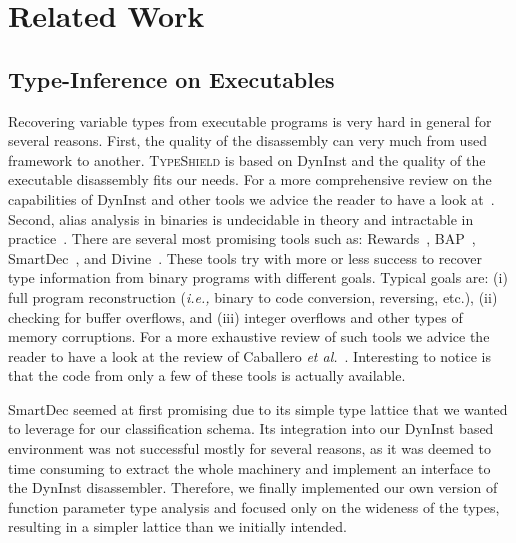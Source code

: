 \section{Related Work}
\label{chapter:Related_Work}

\subsection{Type-Inference on Executables}
\label{Type-Inference on Executables}
Recovering variable types from executable programs
is very hard in general for several reasons. 
First, the quality of the disassembly can very much from used
framework to another. \textsc{TypeShield} is based on DynInst 
and the quality of the executable disassembly fits our needs. 
For a more comprehensive review on the capabilities of DynInst and other tools we
advice the reader to have a look at~\cite{andriesse:indepth}.
Second, alias analysis in binaries is undecidable in theory and intractable in practice~\cite{alan:mycroft}.
There are several most promising tools such as: Rewards~\cite{lin:rewards}, BAP~\cite{bap:brumley}, 
SmartDec~\cite{fokin:smartdec}, and Divine~\cite{divine:balakrishnan}.
These tools try with more or less success to recover 
type information from binary programs with different goals.
Typical goals are: 
(i) full program reconstruction (\textit{i.e.,} binary to code conversion, reversing, etc.), 
(ii) checking for buffer overflows, and
(iii) integer overflows and other types of memory corruptions.
For a more exhaustive review of such tools we advice the reader to
have a look at the review of Caballero \textit{et al.}~\cite{caballero:inference}.
Interesting to notice is that the code from only a few of these tools is actually available.

SmartDec seemed at first promising due to its simple type lattice that we wanted to leverage for our classification schema. 
Its integration into our DynInst based environment was not successful mostly for several reasons, as it was deemed to 
time consuming to extract the whole machinery and implement an interface to the DynInst disassembler.
Therefore, we finally implemented our own version of function parameter type analysis and focused only
on the wideness of the types, resulting in a simpler lattice than we initially intended.


